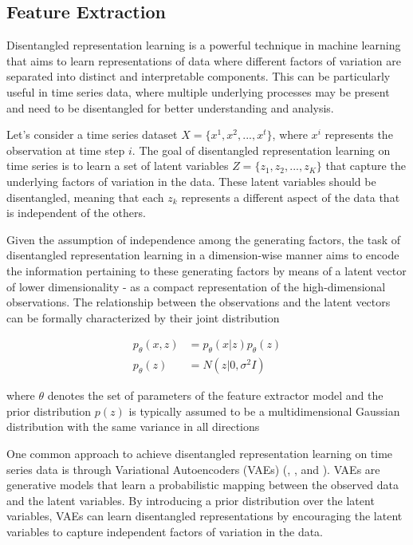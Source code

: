 \subsection{Feature Extraction}

Disentangled representation learning is a powerful technique in machine learning that aims to learn representations of data where different factors of variation are separated into distinct and interpretable components. This can be particularly useful in time series data, where multiple underlying processes may be present and need to be disentangled for better understanding and analysis.

Let's consider a time series dataset $X = \{x^1, x^2, ..., x^t\}$, where $x^i$ represents the observation at time step $i$. The goal of disentangled representation learning on time series is to learn a set of latent variables $Z = \{z_1, z_2, ..., z_K\}$ that capture the underlying factors of variation in the data. These latent variables should be disentangled, meaning that each $z_k$ represents a different aspect of the data that is independent of the others.

Given the assumption of independence among the generating factors, the task of disentangled representation learning in a dimension-wise manner aims to encode the information pertaining to these generating factors by means of a latent vector of lower dimensionality - as a compact representation of the high-dimensional observations. The relationship between the observations and the latent vectors can be formally characterized by their joint distribution

\begin{align}
	p_\theta(x,z) &= p_\theta(x|z) p_\theta(z) \label{eq:1}\\
	p_\theta(z) &= N(z|0, \sigma^2 I) \label{eq:2}
\end{align}

where $\theta$ denotes the set of parameters of the feature extractor model and the prior distribution $p(z)$ is typically assumed to be a multidimensional Gaussian distribution with the same variance in all directions 


One common approach to achieve disentangled representation learning on time series data is through Variational Autoencoders (VAEs) (\citet{duan2019unsupervised}, \citet{li2022towards}, and \citet{li2021learning}). VAEs are generative models that learn a probabilistic mapping between the observed data and the latent variables. By introducing a prior distribution over the latent variables, VAEs can learn disentangled representations by encouraging the latent variables to capture independent factors of variation in the data.

